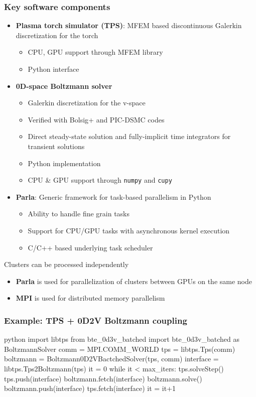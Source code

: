 \documentclass[mathserif, aspectratio=169]{beamer}
\begin{document}
\begin{frame}
	\frametitle{Key software components}
	\begin{itemize}
		\item \textbf{Plasma torch simulator (TPS)}: MFEM based discontinuous Galerkin discretization for the torch
		\begin{itemize}
			\item CPU, GPU support through MFEM library
			\item Python interface
		\end{itemize}
		\item \textbf{0D-space Boltzmann solver}
		\begin{itemize}
			\item Galerkin discretization for the v-space
			\item Verified with Bolsig+ and PIC-DSMC codes
			\item Direct steady-state solution and fully-implicit time integrators for transient solutions
			\item Python implementation
			\item CPU \& GPU support through \texttt{numpy} and \texttt{cupy}
		\end{itemize}
		\item \textbf{Parla}: Generic framework for task-based parallelism in Python
			\begin{itemize}
			\item Ability to handle fine grain tasks
			\item Support for CPU/GPU tasks with asynchronous kernel execution
			\item C/C++ based underlying task scheduler
			\end{itemize}
	\end{itemize}
	Clusters can be processed independently
	\begin{itemize}
		\item \textbf{Parla} is used for parallelization of clusters between GPUs on the same node
		\item \textbf{MPI} is used for distributed memory parallelism
	\end{itemize}
\end{frame}





\begin{frame}[fragile]
\frametitle{Example: TPS + 0D2V Boltzmann coupling}
\begin{mintedbox}{python}%
import libtps
from   bte_0d3v_batched import bte_0d3v_batched as BoltzmannSolver
comm = MPI.COMM_WORLD
tps = libtps.Tps(comm)
boltzmann = Boltzmann0D2VBactchedSolver(tps, comm)
interface = libtps.Tps2Boltzmann(tps)
it = 0
while it < max_iters:
    tps.solveStep()
    tps.push(interface)
    boltzmann.fetch(interface)
    boltzmann.solve()
    boltzmann.push(interface)
    tps.fetch(interface)
    it = it+1
\end{mintedbox}
\end{frame}
\end{document}
